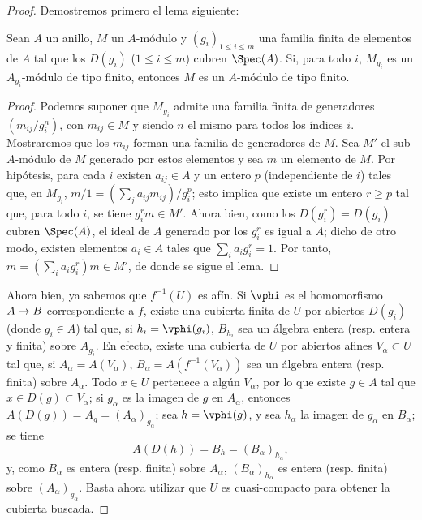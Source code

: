 \documentclass[oneside,10pt]{amsart}
\makeatletter
\renewcommand{\leq}{\leqslant}
\renewcommand{\geq}{\geqslant}
\newcommand{\ega@arrow}[2]{\mathchoice{#1}{#2}{#2}{#2}}
\renewcommand{\to}{\ega@arrow{\longrightarrow}{\rightarrow}}
\newcommand{\oldpage}[2][]{\marginnote{\normalfont\footnotesize\textbf{#1}~|~#2}\ignorespaces}
\let\EGAOriginalLabel\label
\renewcommand{\label}[1]{\phantomsection\EGAOriginalLabel{#1}}
\makeatother
\begin{document}
\oldpage[II]{111}
\begin{proof}
Demostremos primero el lema siguiente:

  \begin{lemma}[6.1.4.1]
  \label{II.6.1.4.1}
  Sean $A$ un anillo, $M$ un $A$-módulo y $(g_i)_{1\leq i\leq m}$ una familia finita de elementos de $A$ tal que los $D(g_i)$ ($1\leq i\leq m$) cubren $\Spec(A)$.
  Si, para todo $i$, $M_{g_i}$ es un $A_{g_i}$-módulo de tipo finito, entonces $M$ es un $A$-módulo de tipo finito.
  \end{lemma}

  \begin{proof}
  Podemos suponer que $M_{g_i}$ admite una familia finita de generadores $(m_{ij}/g_i^n)$, con $m_{ij}\in M$ y siendo $n$ el mismo para todos los índices $i$.
  Mostraremos que los $m_{ij}$ forman una familia de generadores de $M$.
  Sea $M'$ el sub-$A$-módulo de $M$ generado por estos elementos y sea $m$ un elemento de $M$.
  Por hipótesis, para cada $i$ existen $a_{ij}\in A$ y un entero $p$ (independiente de $i$) tales que, en $M_{g_i}$, $m/1=(\sum_j a_{ij}m_{ij})/g_i^p$;
  esto implica que existe un entero $r\geq p$ tal que, para todo $i$, se tiene $g_i^rm\in M'$.
  Ahora bien, como los $D(g_i^r)=D(g_i)$ cubren $\Spec(A)$, el ideal de $A$ generado por los $g_i^r$ es igual a $A$; dicho de otro modo, existen elementos $a_i\in A$ tales que $\sum_i a_ig_i^r=1$.
  Por tanto, $m=(\sum_i a_i g_i^r)m\in M'$, de donde se sigue el lema.
  \end{proof}

Ahora bien, ya sabemos  que $f^{-1}(U)$ es afín.
Si $\vphi$ es el homomorfismo $A\to B$ correspondiente a $f$, existe una cubierta finita de $U$ por abiertos $D(g_i)$ (donde $g_i\in A$) tal que, si $h_i=\vphi(g_i)$, $B_{h_i}$ sea un álgebra entera (resp. entera y finita) sobre $A_{g_i}$.
En efecto, existe una cubierta de $U$ por abiertos afines $V_\alpha\subset U$ tal que, si $A_\alpha=A(V_\alpha)$, $B_\alpha=A(f^{-1}(V_\alpha))$ sea un álgebra entera (resp. finita) sobre $A_\alpha$.
Todo $x\in U$ pertenece a algún $V_\alpha$, por lo que existe $g\in A$ tal que $x\in D(g)\subset V_\alpha$;
si $g_\alpha$ es la imagen de $g$ en $A_\alpha$, entonces $A(D(g))=A_g=(A_\alpha)_{g_\alpha}$;
sea $h=\vphi(g)$, y sea $h_\alpha$ la imagen de $g_\alpha$ en $B_\alpha$;
se tiene
\[
  A(D(h)) = B_h = (B_\alpha)_{h_\alpha},
\]
y, como $B_\alpha$ es entera (resp. finita) sobre $A_\alpha$, $(B_\alpha)_{h_\alpha}$ es entera (resp. finita) sobre $(A_\alpha)_{g_\alpha}$.
Basta ahora utilizar que $U$ es cuasi-compacto para obtener la cubierta buscada.


\end{proof}
\end{document}
